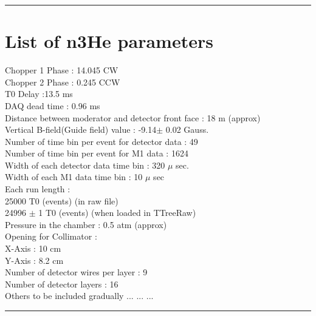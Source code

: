 \documentclass[12pt]{article}
\begin{document}
\noindent
{\color{red} \rule{\linewidth}{1mm} }

\newpage
\section{List of n3He parameters}

Chopper 1 Phase : 14.045 CW \\
Chopper 2 Phase : 0.245 CCW \\
T0 Delay :13.5 ms \\
DAQ dead time : 0.96 ms \\
Distance between moderator and detector front face : 18 m (approx) \\
Vertical B-field(Guide field) value : -9.14$\pm$ 0.02 Gauss.\\
Number of time bin per event for detector data : 49\\
Number of time bin per event for M1 data : 1624\\
Width of each detector data time bin : 320 $\mu$ sec.\\
Width of each M1 data time bin : 10 $\mu$ sec\\
Each run length : \\
\hspace{5cm} 25000 T0 (events) (in raw file)\\
\hspace{5cm} 24996 $\pm$ 1 T0 (events) (when loaded in TTreeRaw)\\
Pressure in the chamber : 0.5 atm (approx) \\
Opening for Collimator :  \\
\hspace{5cm} X-Axis : 10 cm \\
\hspace{5cm} Y-Axis : 8.2 cm \\
Number of detector wires per layer : 9 \\
Number of detector layers : 16 \\


Others to be included gradually ... ... ... \\



\noindent
{\color{red} \rule{\linewidth}{1mm} }
\end{document}
